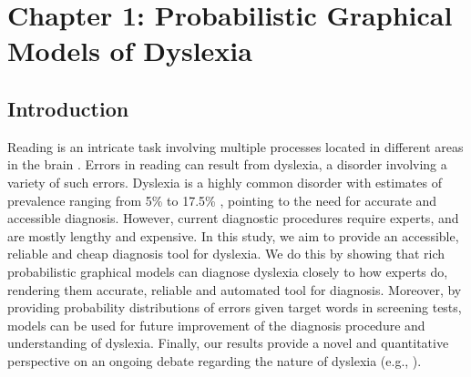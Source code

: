 
\chapter{Chapter 1: Probabilistic Graphical Models of Dyslexia}
\section{Introduction}
Reading is an intricate task involving multiple processes located in different areas in the brain \citep{price2012review}. Errors in reading can result from dyslexia, a disorder involving a variety of such errors. Dyslexia is a highly common disorder with estimates of prevalence ranging from 5\% to 17.5\% \citep{ss05}, pointing to the need for accurate and accessible diagnosis. However, current diagnostic procedures require experts, and are mostly lengthy and expensive. In this study, we aim to provide an accessible, reliable and cheap diagnosis tool for dyslexia. We do this by showing that rich probabilistic graphical models can diagnose dyslexia closely to how experts do, rendering them accurate, reliable and automated tool for diagnosis. Moreover, by providing probability distributions of errors given target words in screening tests, models can be used for future improvement of the diagnosis procedure and understanding of dyslexia. Finally, our results provide a novel and quantitative perspective on an ongoing debate regarding the nature of dyslexia (e.g., \citealp{eg14}).

